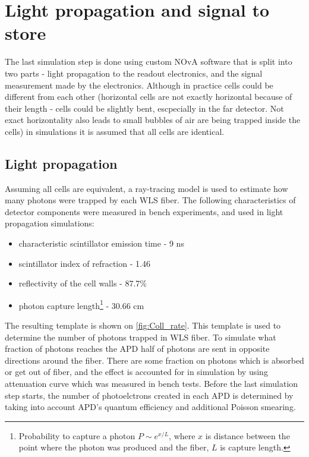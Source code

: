 \section{Light propagation and signal to store}
The last simulation step is done using custom NOvA software that is split into two parts - light
propagation to the readout electronics, and the signal measurement made by the electronics. Although in practice cells could 
be different from each other (horizontal cells are not exactly horizontal because of their length - cells could be
slightly bent, escpecially in the far detector. Not exact horizontality also leads to small bubbles of air are
being trapped inside the cells) in simulations it is assumed that all cells are identical.

\subsection{Light propagation}
Assuming all cells are equivalent, a ray-tracing model is used to estimate how many photons were trapped by
each WLS fiber. The following characteristics of detector components were measured in bench experiments, and
used in light propagation simulations:
\begin{itemize}
\item characteristic scintillator emission time - 9 ns
\item scintillator index of refraction - 1.46
\item reflectivity of the cell walls - 87.7\%
\item photon capture length\footnote{Probability to capture a photon $P \sim e^{x/L}$, where
$x$ is distance between the point where the photon was produced and the fiber, $L$ is capture length.} - 30.66 cm
\end{itemize}
The resulting template is shown on \ref{fig:Coll_rate}. This template is used to determine the number of photons 
trapped in WLS fiber. To simulate what fraction of photons reaches the APD
half of photons are sent in opposite directions around the fiber. There are some fraction on photons which is 
absorbed or get out of fiber, and the effect is accounted for in simulation by using attenuation curve which was 
measured in bench tests. Before the last simulation step starts, the number of photoelctrons created in each APD
is determined by taking into account APD's quantum efficiency and additional Poisson smearing.
